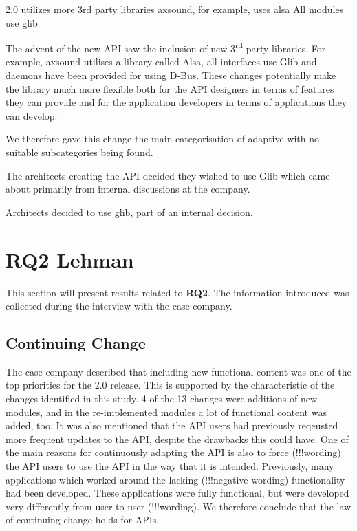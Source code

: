 \documentclass{sig-alternate}
\begin{document}
2.0 utilizes more 3rd party libraries
axsound, for example, uses alsa
All modules use glib

The advent of the new API saw the inclusion of new 3\textsuperscript{rd} party libraries. For example, axsound utilises a library called Alsa, all interfaces use Glib and daemons have been provided for using D-Bus. These changes potentially make the library much more flexible both for the API designers in terms of features they can provide and for the application developers in terms of applications they can develop.

We therefore gave this change the main categorisation of adaptive with no suitable subcategories being found.


The architects creating the API decided they wished to use Glib which came about primarily from internal discussions at the company.

Architects decided to use glib, part of an internal decision. 


\newpage
\section{RQ2 Lehman}
This section will present results related to \textbf{RQ2}. The information introduced was collected during the interview with the case company. 


\subsection{Continuing Change}
The case company described that including new functional content was one of the top priorities for the 2.0 release. This is supported by the characteristic of the changes identified in this study. 4 of the 13 changes were additions of new modules, and in the re-implemented modules a lot of functional content was added, too. It was also mentioned that the API users had previously reqeusted more frequent updates to the API, despite the drawbacks this could have. One of the main reasons for continuously adapting the API is also to force (!!!wording) the API users to use the API in the way that it is intended. Previously, many applications which worked around the lacking (!!!negative wording) functionality had been developed. These applications were fully functional, but were developed very differently from user to user (!!!wording). We therefore conclude that the law of continuing change holds for APIs. 
\end{document}
